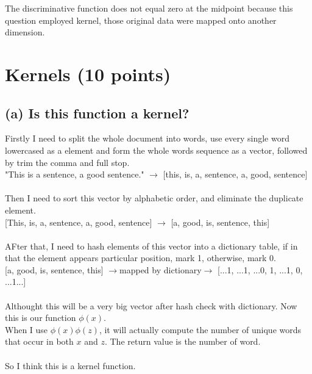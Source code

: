 \documentclass[12pt]{article}
\begin{document}
The discriminative function does not equal zero at the midpoint because this question employed kernel, those original data were mapped onto another dimension.
\section{Kernels (10 points)}
\subsection*{(a) Is this function a kernel?}
Firstly I need to split the whole document into words, use every single word lowercased as a element and form the whole words sequence as a vector, followed by trim the comma and full stop.\\

"This is a sentence, a good sentence." $\rightarrow$ [this, is, a, sentence, a, good, sentence]\\\\
Then I need to sort this vector by alphabetic order, and eliminate the duplicate element.\\

[This, is, a, sentence, a, good, sentence] $\rightarrow$ [a, good, is, sentence, this]\\\\
AFter that, I need to hash elements of this vector into a dictionary table, if in that the element appears particular position, mark 1, otherwise, mark 0.\\

[a, good, is, sentence, this] $\rightarrow$mapped by dictionary$\rightarrow$ [...1, ...1, ...0, 1, ...1, 0, ...1...]\\\\
Althought this will be a very big vector after hash check with dictionary. Now this is our function $\phi(x)$.\\
When I use $\phi(x)\phi(z)$, it will actually compute the number of unique words that occur in both $x$ and $z$. The return value is the number of word.\\\\
So I think this is a kernel function.
\end{document}
